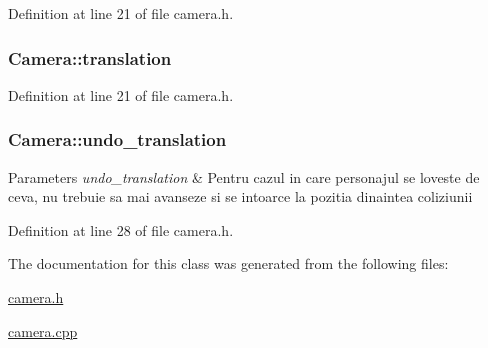 Definition at line 21 of file camera.\-h.

\hypertarget{class_camera_ad86bc5edaaf030fa76edac96040e56f4}{
\subsubsection[{translation}]{ Camera\-::translation}}\label{class_camera_ad86bc5edaaf030fa76edac96040e56f4}


Definition at line 21 of file camera.\-h.

\hypertarget{class_camera_aa2e21e07158e70c900e1a8473b4e96d7}{
\subsubsection[{undo\-\_\-translation}]{ Camera\-::undo\-\_\-translation}}\label{class_camera_aa2e21e07158e70c900e1a8473b4e96d7}

\begin{DoxyParams}{Parameters}
{\em undo\-\_\-translation} & Pentru cazul in care personajul se loveste de ceva, nu trebuie sa mai avanseze si se intoarce la pozitia dinaintea coliziunii \\
\hline
\end{DoxyParams}


Definition at line 28 of file camera.\-h.



The documentation for this class was generated from the following files\-:\begin{DoxyCompactItemize}
\item 
\hyperlink{camera_8h}{camera.\-h}\item 
\hyperlink{camera_8cpp}{camera.\-cpp}\end{DoxyCompactItemize}
